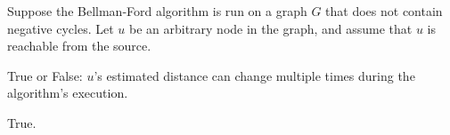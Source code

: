 \begin{prob}
    Suppose the Bellman-Ford algorithm is run on a graph $G$ that does not
    contain negative cycles. Let $u$ be an arbitrary node in the graph, and
    assume that $u$ is reachable from the source.

    True or False: $u$'s estimated distance can change multiple times during
    the algorithm's execution.

    \Tf{}

    \begin{soln}
        True.
    \end{soln}

\end{prob}

